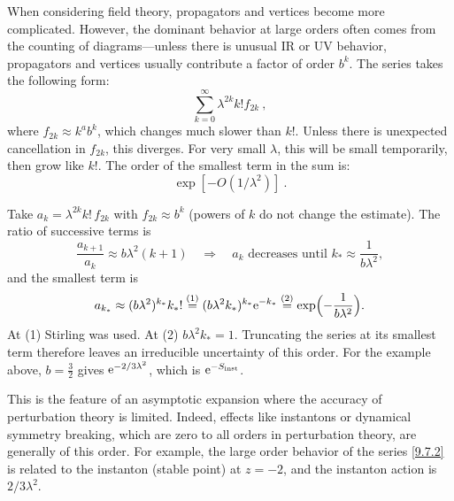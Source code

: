 When considering field theory, propagators and vertices become more complicated. However, the dominant behavior at large orders often comes from the counting of diagrams—unless there is unusual IR or UV behavior, propagators and vertices usually contribute a factor of order $b^{k}$. 
The series takes the following form:
\begin{equation}
	\sum_{k=0}^{\infty} \lambda^{2 k} k !
	f_{2 k} \:, \label{9.7.5}
\end{equation}
where $f_{2 k} \approx k^{a} b^{k}$, which changes much slower than $k!$. Unless there is unexpected cancellation in $f_{2 k}$, this diverges.
For very small $\lambda$, this will be small temporarily, then grow like $k!$. The order of the smallest term in the sum is:
\begin{equation}
	\exp [-O(1 / \lambda^{2})] \:. \label{9.7.6}
\end{equation}
\begin{tcolorbox}[breakable]
	\begin{remark}
		Take $a_k=\lambda^{2k}k!\,f_{2k}$ with $f_{2k}\approx b^k$ (powers of $k$ do not change the estimate). The ratio of successive terms is
		\begin{equation*}
			\frac{a_{k+1}}{a_k}\approx b\lambda^2(k+1)\quad\Longrightarrow\quad a_k\text{ decreases until }k_*\approx\frac{1}{b\lambda^2},
		\end{equation*}
		and the smallest term is
		\begin{equation*}
			a_{k_*}\approx(b\lambda^2)^{k_*}k_*!\overset{(1)}{=}(b\lambda^2k_*)^{k_*}\mathrm{e}^{-k_*}\overset{(2)}{=}\exp\Bigl(-\frac{1}{b\lambda^2}\Bigr) .
		\end{equation*}
		At (1) Stirling was used. At (2) $b\lambda^2k_*=1$. Truncating the series at its smallest term therefore leaves an irreducible uncertainty of this order. For the example above, $b=\frac32$ gives $\mathrm{e}^{-2/3\lambda^2}$, which is $\mathrm{e}^{-S_{\text{inst}}}$.
	\end{remark}
\end{tcolorbox}
This is the feature of an asymptotic expansion where the accuracy of perturbation theory is limited. Indeed, effects like instantons or dynamical symmetry breaking, which are zero to all orders in perturbation theory, are generally of this order.
For example, the large order behavior of the series \eqref{9.7.2} is related to the instanton (stable point) at $z=-2$, and the instanton action is $2 / 3 \lambda^{2}$.

